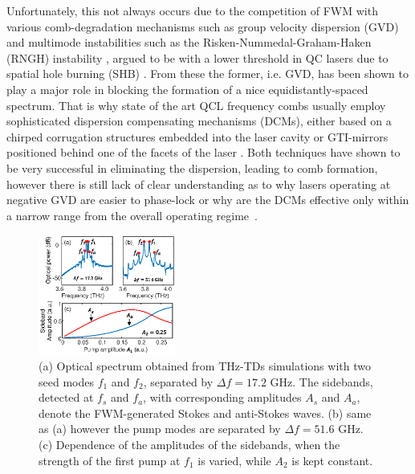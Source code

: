 \documentclass[journal]{IEEEtran}
\begin{document}
	Unfortunately, this not always occurs due to the competition of FWM with various comb-degradation mechanisms such as group velocity dispersion (GVD) and multimode instabilities such as the Risken-Nummedal-Graham-Haken (RNGH) instability \cite{risken1968self,graham1968quantum}, argued to be with a lower threshold in QC lasers due to spatial hole burning (SHB) \cite{gordon2008multimode}. From these the former, i.e. GVD, has been shown \cite{burghoff2015evaluating,villares2016dispersion} to play a major role in blocking the formation of a nice equidistantly-spaced spectrum. That is why state of the art QCL frequency combs usually employ sophisticated dispersion compensating mechanisms (DCMs), either based on a chirped corrugation structures embedded into the laser cavity \cite{burghoff2014terahertz} or GTI-mirrors positioned behind one of the facets of the laser \cite{villares2016dispersion}. Both techniques have shown to be very successful in eliminating the dispersion, leading to comb formation, however there is still lack of clear understanding as to why lasers operating at negative GVD are easier to phase-lock \cite{villares2016dispersion} or why are the DCMs effective only within a narrow range from the overall operating regime~\cite{burghoff2014terahertz}.
	
	\begin{figure}[h!]
		\centering
		\includegraphics[width=0.40\textwidth]{IMGS/FWM_PROOF}
		\caption{(a) Optical spectrum obtained from THz-TDs simulations with two seed modes $f_1$ and $f_2$, separated by $\Delta f = 17.2$ GHz. The sidebands, detected at $f_s$ and $f_a$, with corresponding amplitudes $A_s$ and $A_a$, denote the FWM-generated Stokes and anti-Stokes waves. (b) same as (a) however the pump modes are separated by $\Delta f = 51.6$ GHz. (c) Dependence of the amplitudes of the sidebands, when the strength of the first pump at $f_1$ is varied, while $A_2$ is kept constant.  }	\label{fig:FWM_proof}
	\end{figure}
	
\end{document}
